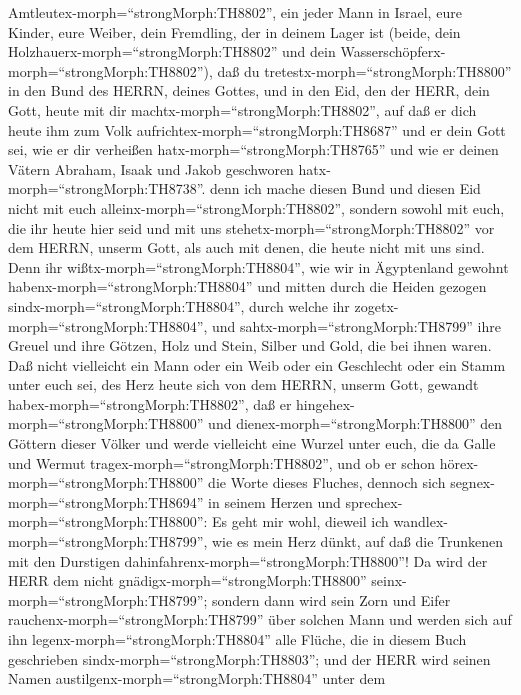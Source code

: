 Amtleutex-morph=``strongMorph:TH8802'', ein jeder Mann in Israel,
 eure Kinder, eure Weiber, dein Fremdling, der in deinem
Lager ist (beide, dein Holzhauerx-morph=``strongMorph:TH8802'' und dein
Wasserschöpferx-morph=``strongMorph:TH8802''),  daß du
tretestx-morph=``strongMorph:TH8800'' in den Bund des HERRN, deines
Gottes, und in den Eid, den der HERR, dein Gott, heute mit dir
machtx-morph=``strongMorph:TH8802'',  auf daß er dich heute
ihm zum Volk aufrichtex-morph=``strongMorph:TH8687'' und er dein Gott
sei, wie er dir verheißen hatx-morph=``strongMorph:TH8765'' und wie er
deinen Vätern Abraham, Isaak und Jakob geschworen
hatx-morph=``strongMorph:TH8738''.  denn ich mache diesen
Bund und diesen Eid nicht mit euch alleinx-morph=``strongMorph:TH8802'',
 sondern sowohl mit euch, die ihr heute hier seid und mit
uns stehetx-morph=``strongMorph:TH8802'' vor dem HERRN, unserm Gott, als
auch mit denen, die heute nicht mit uns sind.  Denn ihr
wißtx-morph=``strongMorph:TH8804'', wie wir in Ägyptenland gewohnt
habenx-morph=``strongMorph:TH8804'' und mitten durch die Heiden gezogen
sindx-morph=``strongMorph:TH8804'', durch welche ihr
zogetx-morph=``strongMorph:TH8804'',  und
sahtx-morph=``strongMorph:TH8799'' ihre Greuel und ihre Götzen, Holz und
Stein, Silber und Gold, die bei ihnen waren.  Daß nicht
vielleicht ein Mann oder ein Weib oder ein Geschlecht oder ein Stamm
unter euch sei, des Herz heute sich von dem HERRN, unserm Gott, gewandt
habex-morph=``strongMorph:TH8802'', daß er
hingehex-morph=``strongMorph:TH8800'' und
dienex-morph=``strongMorph:TH8800'' den Göttern dieser Völker und werde
vielleicht eine Wurzel unter euch, die da Galle und Wermut
tragex-morph=``strongMorph:TH8802'',  und ob er schon
hörex-morph=``strongMorph:TH8800'' die Worte dieses Fluches, dennoch
sich segnex-morph=``strongMorph:TH8694'' in seinem Herzen und
sprechex-morph=``strongMorph:TH8800'': Es geht mir wohl, dieweil ich
wandlex-morph=``strongMorph:TH8799'', wie es mein Herz dünkt, auf daß
die Trunkenen mit den Durstigen
dahinfahrenx-morph=``strongMorph:TH8800''!  Da wird der
HERR dem nicht gnädigx-morph=``strongMorph:TH8800''
seinx-morph=``strongMorph:TH8799''; sondern dann wird sein Zorn und
Eifer rauchenx-morph=``strongMorph:TH8799'' über solchen Mann und werden
sich auf ihn legenx-morph=``strongMorph:TH8804'' alle Flüche, die in
diesem Buch geschrieben sindx-morph=``strongMorph:TH8803''; und der HERR
wird seinen Namen austilgenx-morph=``strongMorph:TH8804'' unter dem
